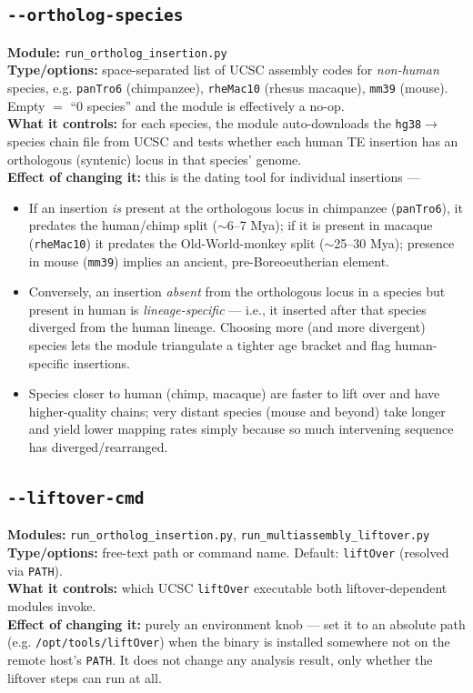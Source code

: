 \documentclass[11pt]{article}
\newcommand{\param}[1]{\subsection*{\texttt{-\/-#1}}}
\begin{document}
\param{ortholog-species}
\textbf{Module:} \texttt{run\_ortholog\_insertion.py}\\
\textbf{Type/options:} space-separated list of UCSC assembly codes for
\emph{non-human} species, e.g. \texttt{panTro6} (chimpanzee), \texttt{rheMac10}
(rhesus macaque), \texttt{mm39} (mouse). Empty $=$ ``0 species'' and the module is
effectively a no-op.\\
\textbf{What it controls:} for each species, the module auto-downloads the
\texttt{hg38}$\to$species chain file from UCSC and tests whether each human TE
insertion has an orthologous (syntenic) locus in that species' genome.\\
\textbf{Effect of changing it:} this is the dating tool for individual insertions —
\begin{itemize}[leftmargin=1.4em,topsep=2pt,itemsep=2pt]
  \item If an insertion \emph{is} present at the orthologous locus in chimpanzee
    (\texttt{panTro6}), it predates the human/chimp split ($\sim$6--7 Mya); if it is
    present in macaque (\texttt{rheMac10}) it predates the Old-World-monkey split
    ($\sim$25--30 Mya); presence in mouse (\texttt{mm39}) implies an ancient,
    pre-Boreoeutherian element.
  \item Conversely, an insertion \emph{absent} from the orthologous locus in a species
    but present in human is \emph{lineage-specific} — i.e., it inserted after that
    species diverged from the human lineage. Choosing more (and more divergent) species
    lets the module triangulate a tighter age bracket and flag human-specific
    insertions.
  \item Species closer to human (chimp, macaque) are faster to lift over and have
    higher-quality chains; very distant species (mouse and beyond) take longer and
    yield lower mapping rates simply because so much intervening sequence has
    diverged/rearranged.
\end{itemize}

\param{liftover-cmd}
\textbf{Modules:} \texttt{run\_ortholog\_insertion.py},
\texttt{run\_multiassembly\_liftover.py}\\
\textbf{Type/options:} free-text path or command name. Default: \texttt{liftOver}
(resolved via \texttt{PATH}).\\
\textbf{What it controls:} which UCSC \texttt{liftOver} executable both
liftover-dependent modules invoke.\\
\textbf{Effect of changing it:} purely an environment knob — set it to an absolute
path (e.g. \texttt{/opt/tools/liftOver}) when the binary is installed somewhere not on
the remote host's \texttt{PATH}. It does not change any analysis result, only whether
the liftover steps can run at all.
\end{document}
